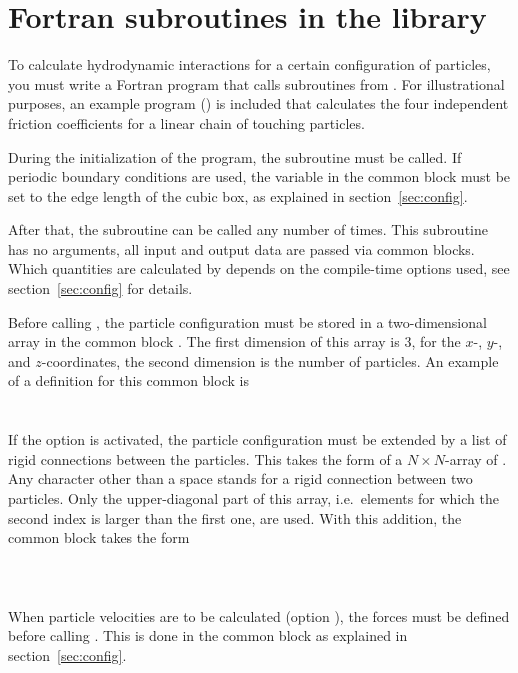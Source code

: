 \section{Fortran subroutines in the library}
\label{sec:imp}

To calculate hydrodynamic interactions for a certain configuration of
particles, you must write a Fortran program that calls subroutines
from . For illustrational
purposes, an example program () is included that
calculates the four independent friction coefficients for a linear
chain of touching particles.

During the initialization of the program, the subroutine 
must be called. If periodic boundary conditions are used, the
variable  in the common block  must be set to the
edge length of the cubic box, as explained in section~\ref{sec:config}.

After that, the subroutine  can be called any number of times.
This subroutine has no arguments, all input and output data are
passed via common blocks. Which quantities are calculated by
 depends on the compile-time options used, see
section~\ref{sec:config} for details.

Before calling , the particle configuration must be
stored in a two-dimensional array in the
common block . The first dimension of this array is 3, for
the $x$-, $y$-, and $z$-coordinates, the second dimension is the
number of particles. An example of a definition for this common block
is\\
\wsp{}\\
\wsp{}\\
If the option  is activated, the particle configuration
must be extended by a list of rigid connections between the particles.
This takes the form of a $N\times N$-array of . Any
character other than a space stands for a rigid connection between
two particles. Only the upper-diagonal part of this array, i.e.\ elements
for which the second index is larger than the first one, are used.
With this addition, the common block  takes the form\\
\wsp{}\\
\wsp{}\\
\wsp{}\\

When particle velocities are to be calculated (option
), the forces must be defined before calling
. This is done in the common block
 as explained in section~\ref{sec:config}.


